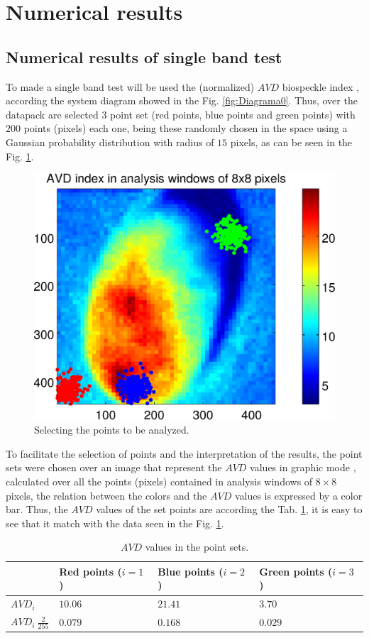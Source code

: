\documentclass[review]{elsarticle}
\begin{document}
\section{Numerical results} 
\label{sec:numerical}

\subsection{Numerical results of single band test} 
\label{subsec:numericalsingle}
To made a single band test will be used the (normalized) $AVD$ biospeckle index \cite{avd},
according the system diagram showed in the Fig. \ref{fig:Diagrama0}. Thus,
over the datapack are selected 3 point set (red points, blue points and green points) with 
$200$ points (pixels) each one, being these randomly chosen in the space using a Gaussian probability distribution 
with radius of $15$ pixels, 
as can be seen in the Fig. \ref{fig:select_points_avd}.
\begin{figure}[ht!]
\centering
\includegraphics[width=0.5\columnwidth]{select_points_avd.eps}
\caption{Selecting the points to be analyzed.}
\label{fig:select_points_avd}
\end{figure}
To facilitate the selection of points and the interpretation of the results, 
the point sets were chosen over an image that represent the $AVD$ values in graphic mode \cite{BSLTLBOOK},
calculated over all the points (pixels) contained in analysis windows of $8 \times 8$ pixels,
the relation between the colors and the $AVD$ values is expressed by a color bar.
Thus, the $AVD$ values of the set points are according the Tab. \ref{tab:1}, it is easy to see
that it match with the data seen in the Fig. \ref{fig:select_points_avd}.
\begin{table}[!hbt]
\caption{$AVD$ values in the point sets.}
\begin{center}
\begin{tabular}{|l |l | l | l |}
\hline
   ~               & Red points ($i=1$) & Blue points ($i=2$) & Green points ($i=3$) \\
\hline
\hline
$AVD_i$              & $10.06$   & $21.41$    & $3.70$ \\
\hline
$AVD_i~\frac{2}{255}$ & $0.079$   & $0.168$    & $0.029$ \\
\hline
\end{tabular}
\end{center}
\label{tab:1}
\end{table}
\end{document}
